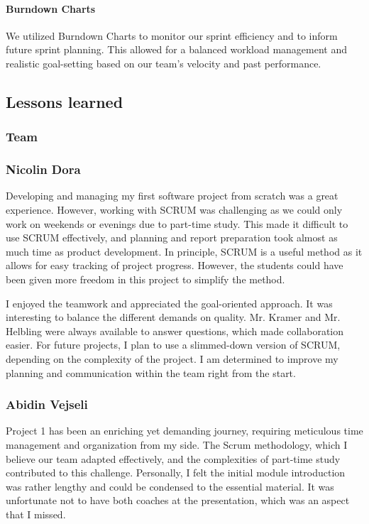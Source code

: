 \paragraph{Burndown Charts}
We utilized Burndown Charts to monitor our sprint efficiency and to inform future sprint planning.
This allowed for a balanced workload management and realistic goal-setting based on our team's velocity and past performance.


\subsection{Lessons learned}

\subsubsection{Team}

\subsubsection{Nicolin Dora}
Developing and managing my first software project from scratch was a great experience.
However, working with SCRUM was challenging as we could only work on weekends or evenings due to part-time study.
This made it difficult to use SCRUM effectively, and planning and report preparation took almost as much time as product development.
In principle, SCRUM is a useful method as it allows for easy tracking of project progress.
However, the students could have been given more freedom in this project to simplify the method.

I enjoyed the teamwork and appreciated the goal-oriented approach.
It was interesting to balance the different demands on quality.
Mr. Kramer and Mr. Helbling were always available to answer questions, which made collaboration easier.
For future projects, I plan to use a slimmed-down version of SCRUM, depending on the complexity of the project.
I am determined to improve my planning and communication within the team right from the start.

\subsubsection{Abidin Vejseli}
Project 1 has been an enriching yet demanding journey, requiring meticulous time management and organization from my side.
The Scrum methodology, which I believe our team adapted effectively, and the complexities of part-time study contributed to this challenge.
Personally, I felt the initial module introduction was rather lengthy and could be condensed to the essential material.
It was unfortunate not to have both coaches at the presentation, which was an aspect that I missed.


